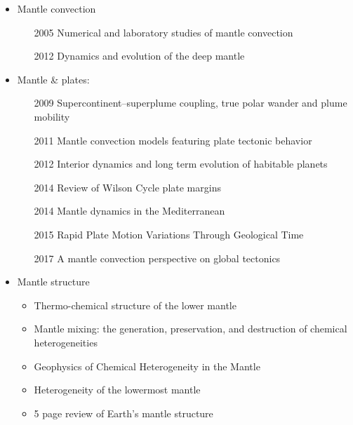 \begin{itemize}
\item Mantle convection 

   \begin{itemize}
   \item [2005] Numerical and laboratory studies of mantle convection \cite{taxn05}
   \item [2012] Dynamics and evolution of the deep mantle  \cite{tack12}
   \end{itemize}

\item Mantle \& plates:
   \begin{itemize}
   \item [2009] Supercontinent–superplume coupling, true polar wander and plume mobility \cite{lizh09}
   \item [2011] Mantle convection models featuring plate tectonic behavior \cite{lowm11}
   \item [2012] Interior dynamics and long term evolution of habitable planets \cite{taab12}
   \item [2014] Review of Wilson Cycle plate margins \cite{buto14}
   \item [2014]Mantle dynamics in the Mediterranean \cite{faba14}
   \item [2015] Rapid Plate Motion Variations Through Geological Time \cite{iabu15}
   \item [2017] A mantle convection perspective on global tectonics \cite{cogu17}
   \end{itemize}

\item Mantle structure
   \begin{itemize}
   \item Thermo-chemical structure of the lower mantle \cite{dett07}
   \item Mantle mixing: the generation, preservation, and destruction of chemical heterogeneities \cite{vahb02}
   \item Geophysics of Chemical Heterogeneity in the Mantle \cite{stli12}
   \item Heterogeneity of the lowermost mantle \cite{garn00}
   \item 5 page review of Earth's mantle structure \cite{hewo01}
   \end{itemize}


\end{itemize}
